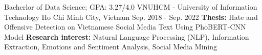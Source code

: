 

\begin{cventries}

  \cventry
    {Bacherlor of Data Science; GPA: 3.27/4.0} %
    {VNUHCM - University of Information Technology} %
    {Ho Chi Minh City, Vietnam} %
    {Sep. 2018 - Sep. 2022} %
    {\textbf{Thesis:} Hate and Offensive Detection on Vietnamese Social Media Text Using PhoBERT-CNN Model\newline
    \textbf{Research interest:} Natural Language Processing (NLP), Information Extraction, Emotions and Sentiment Analysis, Social Media Mining}

\end{cventries}

